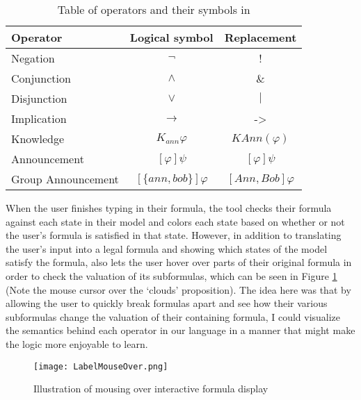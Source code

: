 \begin{table}[H]
\centering
\begin{tabular}{@{}lcc@{}}
\toprule
Operator           & Logical symbol & Replacement     \\  \midrule
Negation           &       $\neg$         & !               \\
Conjunction       &      $\wedge$          & $\&$              \\
Disjunction        &    $\vee$        & $|$               \\
Implication        &       $\rightarrow$       & -\textgreater{} \\
Knowledge         &        $K_{ann}\varphi$        & $KAnn(\varphi)$            \\
Announcement   &       $[\varphi]\psi$         &  $[\varphi]\psi$     \\
Group Announcement &  $[\{ann,bob\}]\varphi$  & $[Ann,Bob]\varphi$ \\ \bottomrule
\end{tabular}%
\caption{Table of operators and their symbols in \cname{}}
\label{tbl:symbolReplacements}
\end{table}



When the user finishes typing in their formula, the tool checks their formula against each state in their model and colors each state based on whether or not the user's formula is satisfied in that state. However, in addition to translating the user's input into a legal formula and showing which states of the model satisfy the formula, \cname{} also lets the user hover over parts of their original formula in order to check the valuation of its subformulas, which can be seen in Figure \ref{fig:labelHover} (Note the mouse cursor over the `clouds' proposition). The idea here was that by allowing the user to quickly break formulas apart and see how their various subformulas change the valuation of their containing formula, I could visualize the semantics behind each operator in our language in a manner that might make the logic more enjoyable to learn. 

\begin{figure}[H]
	\texttt{[image: LabelMouseOver.png]}
	\caption{Illustration of mousing over interactive formula display}	
	\label{fig:labelHover}
\end{figure}



